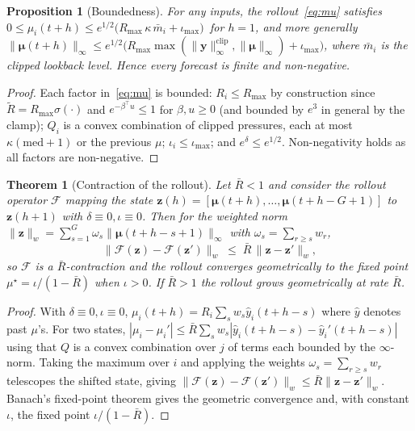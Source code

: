 \documentclass[conference]{IEEEtran}
\newtheorem{theorem}{Theorem}
\newtheorem{proposition}{Proposition}
\begin{document}
\begin{proposition}[Boundedness]\label{prop:bound}
For any inputs, the rollout~\eqref{eq:mu} satisfies $0\le\mu_i(t+h)\le e^{1/2}\big(R_{\max}\,\kappa\,\bar m_i + \iota_{\max}\big)^{\,}$ for $h=1$, and more generally $\|\boldsymbol{\mu}(t+h)\|_\infty \le e^{1/2}\big(R_{\max}\max(\|\mathbf{y}\|_\infty^{\mathrm{clip}},\|\boldsymbol{\mu}\|_\infty) + \iota_{\max}\big)$, where $\bar m_i$ is the clipped lookback level. Hence every forecast is finite and non-negative.
\end{proposition}
\begin{proof}
Each factor in~\eqref{eq:mu} is bounded: $R_i\le R_{\max}$ by construction since $\tilde R=R_{\max}\sigma(\cdot)$ and $e^{-\beta^\top u}\le1$ for $\beta,u\ge0$ (and bounded by $e^{3}$ in general by the clamp); $Q_i$ is a convex combination of clipped pressures, each at most $\kappa(\mathrm{med}+1)$ or the previous $\mu$; $\iota_i\le\iota_{\max}$; and $e^{\delta}\le e^{1/2}$. Non-negativity holds as all factors are non-negative. \end{proof}

\begin{theorem}[Contraction of the rollout]\label{thm:contract}
Let $\bar R<1$ and consider the rollout operator $\mathcal{F}$ mapping the state $\mathbf{z}(h)=[\boldsymbol{\mu}(t+h),\dots,\boldsymbol{\mu}(t+h-G+1)]$ to $\mathbf{z}(h+1)$ with $\delta\equiv0,\iota\equiv0$. Then for the weighted norm $\|\mathbf{z}\|_w=\sum_{s=1}^{G}\omega_s\|\boldsymbol{\mu}(t+h-s+1)\|_\infty$ with $\omega_s=\sum_{r\geq s}w_r$,
\begin{equation}
\|\mathcal{F}(\mathbf{z})-\mathcal{F}(\mathbf{z}')\|_w \;\le\; \bar R\,\|\mathbf{z}-\mathbf{z}'\|_w,
\end{equation}
so $\mathcal{F}$ is a $\bar R$-contraction and the rollout converges geometrically to the fixed point $\mu^\star=\iota/(1-\bar R)$ when $\iota>0$. If $\bar R>1$ the rollout grows geometrically at rate $\bar R$.
\end{theorem}
\begin{proof}
With $\delta\equiv0,\iota\equiv0$, $\mu_i(t+h)=R_i\sum_s w_s \hat y_i(t+h-s)$ where $\hat y$ denotes past $\mu$'s. For two states, $|\mu_i-\mu_i'|\le \bar R\sum_s w_s|\hat y_i(t+h-s)-\hat y_i'(t+h-s)|$ using that $Q$ is a convex combination over $j$ of terms each bounded by the $\infty$-norm. Taking the maximum over $i$ and applying the weights $\omega_s=\sum_{r\ge s}w_r$ telescopes the shifted state, giving $\|\mathcal F(\mathbf z)-\mathcal F(\mathbf z')\|_w\le \bar R\|\mathbf z-\mathbf z'\|_w$. Banach's fixed-point theorem gives the geometric convergence and, with constant $\iota$, the fixed point $\iota/(1-\bar R)$. \end{proof}
\end{document}
